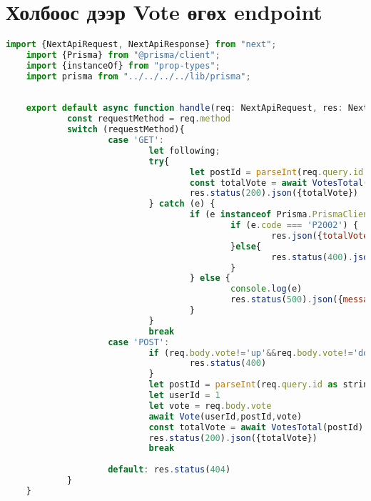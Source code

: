 \chapter{Холбоос дээр Vote өгөх endpoint}
\label{appendix:user-vote-endpoint}

\begin{lstlisting}[language=Javascript, frame=single]
	import {NextApiRequest, NextApiResponse} from "next";
	import {Prisma} from "@prisma/client";
	import {instanceOf} from "prop-types";
	import prisma from "../../../../lib/prisma";
	
	
	export default async function handle(req: NextApiRequest, res: NextApiResponse) {
			const requestMethod = req.method
			switch (requestMethod){
					case 'GET':
							let following;
							try{
									let postId = parseInt(req.query.id as string, 10)
									const totalVote = await VotesTotal(postId)
									res.status(200).json({totalVote})
							} catch (e) {
									if (e instanceof Prisma.PrismaClientKnownRequestError) {
											if (e.code === 'P2002') {
													res.json({totalVote:0})
											}else{
													res.status(400).json(e)
											}
									} else {
											console.log(e)
											res.status(500).json({message: "something wrong try again some time later"})
									}
							}
							break
					case 'POST':
							if (req.body.vote!='up'&&req.body.vote!='down'){
									res.status(400)
							}
							let postId = parseInt(req.query.id as string, 10)
							let userId = 1
							let vote = req.body.vote
							await Vote(userId,postId,vote)
							const totalVote = await VotesTotal(postId)
							res.status(200).json({totalVote})
							break
	
					default: res.status(404)
			}
	}
	

\end{lstlisting}
